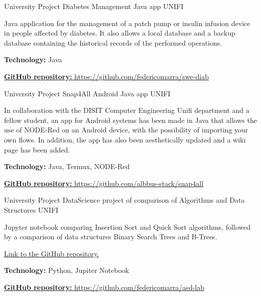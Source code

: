 \begin{cventries}
  \cventry
    {University Project} %
    {Diabetes Management Java app} %
    {UNIFI} %
    {} %
    {
      \begin{cvitems} %
        \item {Java application for the management of a patch pump or insulin infusion device in people affected by diabetes. It also allows a local database and a backup database containing the historical records of the performed operations.}
        \item {\textbf{Technology:} Java}
        \item {\href{https://github.com/federicomarra/swe-diab}{\textbf{GitHub repository:} https://github.com/federicomarra/swe-diab}}
      \end{cvitems}
    }
    
  \cventry
    {University Project} %
    {Snap4All Android Java app} %
    {UNIFI} %
    {} %
    {
      \begin{cvitems} %
        \item {In collaboration with the DISIT Computer Engineering Unifi department and a fellow student, an app for Android systems has been made in Java that allows the use of NODE-Red on an Android device, with the possibility of importing your own flows. In addition, the app has also been aesthetically updated and a wiki page has been added.}
        \item {\textbf{Technology:} Java, Termux, NODE-Red}
        \item {\href{https://github.com/albbus-stack/snap4all}{\textbf{GitHub repository:} https://github.com/albbus-stack/snap4all}}
      \end{cvitems}
    }

  \cventry
    {University Project} %
    {DataScience project of comparison of Algorithms and Data Structures} %
    {UNIFI} %
    {} %
    {
      \begin{cvitems} %
        \item {Jupyter notebook comparing Insertion Sort and Quick Sort algorithms, followed by a comparison of data structures Binary Search Trees and B-Trees.}
        \item {\href{https://github.com/federicomarra/asd-lab}{Link to the GitHub repository.}}
        \item {\textbf{Technology:} Python, Jupiter Notebook}
        \item {\href{https://github.com/federicomarra/asd-lab}{\textbf{GitHub repository:} https://github.com/federicomarra/asd-lab}}
      \end{cvitems}
    }


\end{cventries}
